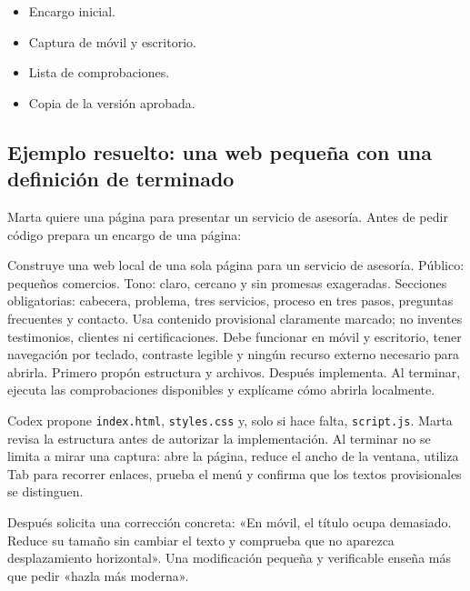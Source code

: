 \documentclass[10pt,a4paper,openany]{book}
\providecommand{\tightlist}{\setlength{\itemsep}{0.18em}\setlength{\parskip}{0pt}}
\newenvironment{Shaded}{}{}
\newcommand{\NormalTok}[1]{#1}
\renewenvironment{Shaded}
  {\begin{tcolorbox}[
    enhanced,
    breakable,
    colback=CodeBg,
    colframe=Border,
    boxrule=0.5pt,
    arc=2mm,
    left=3mm,
    right=3mm,
    top=2.2mm,
    bottom=2.2mm,
    before skip=0.8em,
    after skip=0.9em
  ]}
  {\end{tcolorbox}}
\begin{document}
\begin{itemize}
\tightlist
\item
  Encargo inicial.
\item
  Captura de móvil y escritorio.
\item
  Lista de comprobaciones.
\item
  Copia de la versión aprobada.
\end{itemize}

\subsection{Ejemplo resuelto: una web pequeña con una definición de
terminado}\label{ejemplo-resuelto-una-web-pequeuxf1a-con-una-definiciuxf3n-de-terminado}

Marta quiere una página para presentar un servicio de asesoría. Antes de
pedir código prepara un encargo de una página:

\begin{Shaded}
\begin{Highlighting}[]
\NormalTok{Construye una web local de una sola página para un servicio de asesoría.}
\NormalTok{Público: pequeños comercios. Tono: claro, cercano y sin promesas exageradas.}
\NormalTok{Secciones obligatorias: cabecera, problema, tres servicios, proceso en tres}
\NormalTok{pasos, preguntas frecuentes y contacto. Usa contenido provisional claramente}
\NormalTok{marcado; no inventes testimonios, clientes ni certificaciones.}
\NormalTok{Debe funcionar en móvil y escritorio, tener navegación por teclado, contraste}
\NormalTok{legible y ningún recurso externo necesario para abrirla.}
\NormalTok{Primero propón estructura y archivos. Después implementa. Al terminar,}
\NormalTok{ejecuta las comprobaciones disponibles y explícame cómo abrirla localmente.}
\end{Highlighting}
\end{Shaded}

Codex propone \texttt{index.html}, \texttt{styles.css} y, solo si hace
falta, \texttt{script.js}. Marta revisa la estructura antes de autorizar
la implementación. Al terminar no se limita a mirar una captura: abre la
página, reduce el ancho de la ventana, utiliza Tab para recorrer
enlaces, prueba el menú y confirma que los textos provisionales se
distinguen.

Después solicita una corrección concreta: «En móvil, el título ocupa
demasiado. Reduce su tamaño sin cambiar el texto y comprueba que no
aparezca desplazamiento horizontal». Una modificación pequeña y
verificable enseña más que pedir «hazla más moderna».
\end{document}
